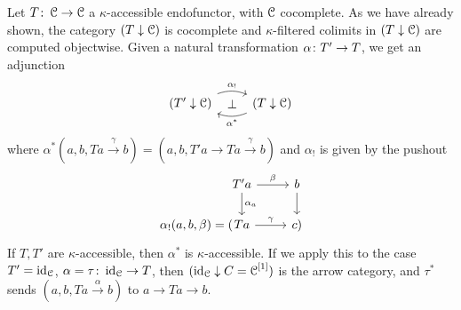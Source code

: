 \documentclass[a4paper,11pt,oneside,openany]{scrbook}
\begin{document}
Let $ T\colon \operatorname{\mathcal{C}} \to \operatorname{\mathcal{C}} $ a $ \kappa $-accessible endofunctor, with $ \operatorname{\mathcal{C}} $ cocomplete.
As we have already shown, the category $ (T \downarrow \operatorname{\mathcal{C}} )$ is cocomplete and $ \kappa $-filtered colimits in $ (T\downarrow\operatorname{\mathcal{C}}) $ are computed objectwise.
Given a natural transformation $ \alpha \colon T' \to T $, we get an adjunction
\begin{displaymath}
    \begin{tikzcd}
	(T' \downarrow \C) \arrow[r, "\alpha_!", bend left=20]
	    \arrow[from=r, "\alpha^*", bend left=20]
	    \arrow[r, phantom, "\bot"]
	    & (T \downarrow \C)
    \end{tikzcd}
\end{displaymath}
where $ \alpha^*(a,b,Ta \xrightarrow{\gamma} b) = (a,b,T'a \to Ta \xrightarrow{\gamma} b) $
and $ \alpha_! $ is given by the pushout
\begin{displaymath}
    \begin{tikzcd}
	&[-3.3em]T'a \arrow[r,"\beta"]\arrow[d,"\alpha_a"]& b\arrow[d]\\
	\alpha_!(a,b,\beta)= (&	Ta \arrow[r, "\gamma"] & c)
    \end{tikzcd}
\end{displaymath}
If $ T,T' $ are $ \kappa $-accessible, then $ \alpha ^* $ is $ \kappa $-accessible.
If we apply this to the case $ T' = \operatorname{id}_{\operatorname{\mathcal{C}}} $, $ \alpha=\tau\colon \operatorname{id}_{\operatorname{\mathcal{C}}} \to T $, then $ (\operatorname{id}_{\operatorname{\mathcal{C}}} \downarrow C = \operatorname{\mathcal{C}} ^{[1]}) $ is the arrow category, and
$ \tau^* $ sends $ (a,b,Ta \xrightarrow{\alpha}b) $ to $ a \to Ta \to b $.
\end{document}
